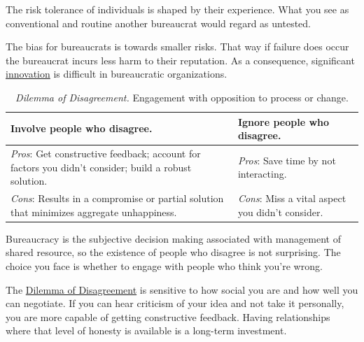 The risk tolerance of individuals is shaped by their experience. What you see as conventional and routine another bureaucrat would regard as untested. 

The bias for bureaucrats is towards smaller risks. That way if failure does occur the bureaucrat incurs less harm to their reputation. As a consequence, significant 
\hyperref[sec:innovation]{innovation} is difficult in bureaucratic organizations. 


\begin{center}
\begin{table}[H]
\begin{tabular}{ | m{\dilemmatablewidth}| m{\dilemmatablewidth} | } 
  \hline
  \textbf{Involve people who disagree.} & 
  \textbf{Ignore people who disagree.} \\ 
  \hline
  \textit{Pros}: Get constructive feedback; account for factors you didn't consider; build a robust solution. & 
  \textit{Pros}: Save time by not interacting. \\  
  \hline
  \textit{Cons}: Results in a compromise or partial solution that minimizes aggregate unhappiness. & 
  \textit{Cons}: Miss a vital aspect you didn't consider. \\  
  \hline
\end{tabular}
\caption{\textit{Dilemma of Disagreement.}
Engagement with opposition to process or change.
}
\label{table:dilemma-personal-opposition-involve-ignore}
\end{table}
\end{center}



Bureaucracy is the subjective decision making associated with management of shared resource, so the existence of people who disagree is not surprising. The choice you face is whether to engage with people who think you're wrong. 

The \hyperref[table:dilemma-personal-opposition-involve-ignore]{Dilemma of Disagreement} is sensitive to how social you are and how well you can negotiate. If you can hear criticism of your idea and not take it personally, you are more capable of getting constructive feedback. Having relationships where that level of honesty is available is a long-term investment.

